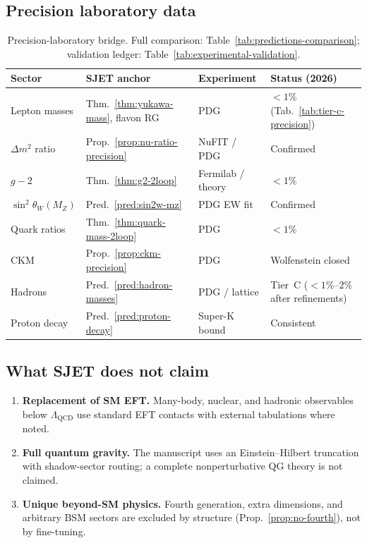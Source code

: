 \documentclass[11pt]{article}
\theoremstyle{plain}
\theoremstyle{definition}
\theoremstyle{remark}
\numberwithin{equation}{section}
\begin{document}
\subsection{Precision laboratory data}
\label{sec:standard-theories:lab}

\begin{table}[ht]
\centering
\small
\renewcommand{\arraystretch}{1.12}
\begin{tabular}{@{}llll@{}}
\toprule
\textbf{Sector} & \textbf{SJET anchor} & \textbf{Experiment} &
\textbf{Status (2026)} \\
\midrule
Lepton masses &
  Thm.~\ref{thm:yukawa-mass}, flavon RG &
  PDG &
  $<1\%$ (Tab.~\ref{tab:tier-c-precision}) \\
$\Delta m^2$ ratio &
  Prop.~\ref{prop:nu-ratio-precision} &
  NuFIT / PDG &
  Confirmed \\
$g-2$ &
  Thm.~\ref{thm:g2-2loop} &
  Fermilab / theory &
  $<1\%$ \\
$\sin^2\theta_W(M_Z)$ &
  Pred.~\ref{pred:sin2w-mz} &
  PDG EW fit &
  Confirmed \\
Quark ratios &
  Thm.~\ref{thm:quark-mass-2loop} &
  PDG &
  $<1\%$ \\
CKM &
  Prop.~\ref{prop:ckm-precision} &
  PDG &
  Wolfenstein closed \\
Hadrons &
  Pred.~\ref{pred:hadron-masses} &
  PDG / lattice &
  Tier~C ($<1\%$--$2\%$ after refinements) \\
Proton decay &
  Pred.~\ref{pred:proton-decay} &
  Super-K bound &
  Consistent \\
\bottomrule
\end{tabular}
\caption{Precision-laboratory bridge. Full comparison:
Table~\ref{tab:predictions-comparison}; validation ledger:
Table~\ref{tab:experimental-validation}.}
\label{tab:lab-bridge}
\end{table}

\subsection{What SJET does not claim}
\label{sec:standard-theories:limits}

\begin{enumerate}[label=(\roman*),leftmargin=*]
  \item \textbf{Replacement of SM EFT.} Many-body, nuclear, and hadronic
    observables below $\Lambda_{\mathrm{QCD}}$ use standard EFT contacts with
    external tabulations where noted.
  \item \textbf{Full quantum gravity.} The manuscript uses an Einstein--Hilbert
    truncation with shadow-sector routing; a complete nonperturbative QG theory
    is not claimed.
  \item \textbf{Unique beyond-SM physics.} Fourth generation, extra dimensions,
    and arbitrary BSM sectors are excluded by structure (Prop.~\ref{prop:no-fourth}),
    not by fine-tuning.
\end{enumerate}
\end{document}
